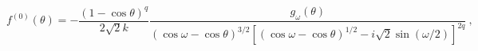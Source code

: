 \begin{equation}
\label{f0}
f^{(0)}(\theta)=-\frac{(1-\cos\theta)^q}{2\sqrt2 k}\frac{g_\omega(\theta)}
{(\cos\omega-\cos\theta)^{3/2}[(\cos\omega-\cos\theta)^{1/2}-i\sqrt2
\sin(\omega/2)]^{2q}} \ ,
\end{equation}

